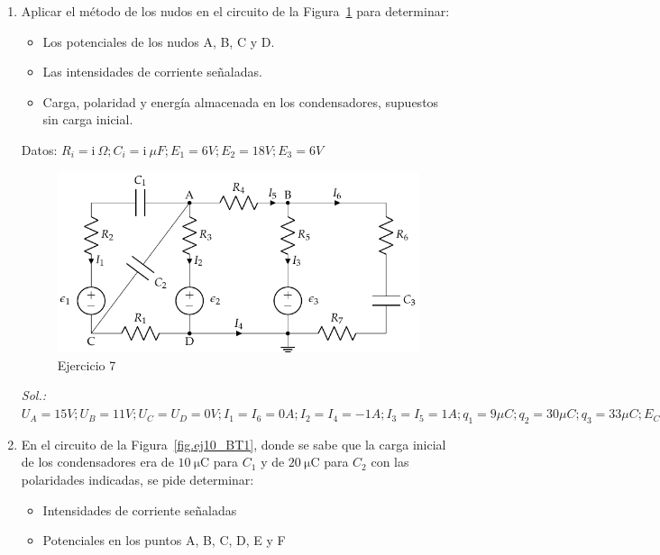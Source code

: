 \begin{enumerate}
  \emph{Sol.:
    $I_1=I_2=I_3=-I_4=1\,A;\; I_5=I_6=I_7=0\,A;\;Q_{1\mu
      F}=-7\,\mu\text{C};\;Q_{2\mu F}=-4\,\mu\text{C};\;Q_{3\mu
      F}=3\,\mu\text{C};\;E_{1\mu F}=24.5\,\mu\text{J};\;E_{2\mu
      F}=4\,\mu\text{J};\; E_{3\mu F}=1.5\,\mu\text{J}$}
\item Aplicar el método de los nudos en el circuito de la
  Figura~\ref{fig.nudos_condensadores} para determinar:
  \begin{itemize}
  \item Los potenciales de los nudos A, B, C y D.
  \item Las intensidades de corriente señaladas.
  \item Carga, polaridad y energía almacenada en los condensadores,
    supuestos sin carga inicial.
  \end{itemize}
  Datos:
  $R_i = \mathrm{i\ } \Omega; C_i = \mathrm{i\ } \mu F; E_1 = 6V; E_2
  = 18 V; E_3 = {6} V$
  \begin{figure}[H]
    \centering \includegraphics[]{../figs/nudos_condensadores.pdf}
    \caption{Ejercicio 7}
    \label{fig.nudos_condensadores}
  \end{figure}
  \emph{Sol.:
    $U_A=15V; U_B=11V; U_C=U_D=0V; I_1=I_6=0A;I_2=I_4=-1A; I_3=I_5=1A;
    q_1=9\mu C; q_2=30\mu C; q_3=33\mu C; E_{C1}=40.5\mu J;
    E_{C2}=225\mu J;E_{C2}=181.5\mu J$}

\item En el circuito de la Figura~\ref{fig.ej10_BT1}, donde se sabe
  que la carga inicial de los condensadores era de
  $\qty{10}{\micro\coulomb}$ para $C_1$ y de
  $\qty{20}{\micro\coulomb}$ para $C_2$ con las polaridades indicadas,
  se pide determinar:
  \begin{itemize}
  \item Intensidades de corriente señaladas
  \item Potenciales en los puntos A, B, C, D, E y F
  \end{itemize}


\end{enumerate}
